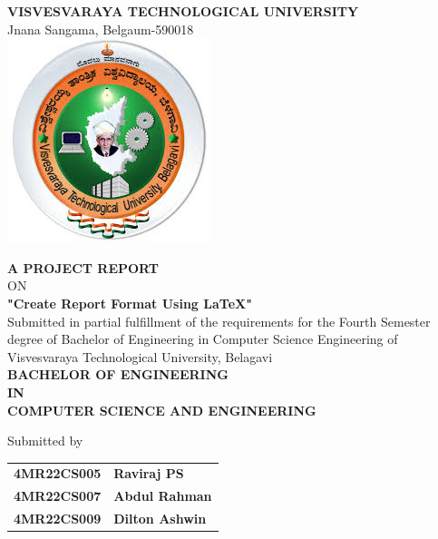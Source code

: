 \documentclass[12pt, a4paper]{report} %
\begin{document}
	
	\begin{titlepage} %
		\begin{center} %
			
			\textbf{{\large VISVESVARAYA TECHNOLOGICAL UNIVERSITY}}\\
			{\normalsize Jnana Sangama, Belgaum-590018}\\
			\vspace{0.3in}
			\includegraphics[scale=0.5]{images/vtu.jpeg}\\
			\vspace{0.3in}
			
			\textbf{A PROJECT REPORT} \\
			ON \\
			\vspace{0.2in}
			\textbf{{\large "Create Report Format Using LaTeX"}}\\
			\vspace{0.1in}
			{\small Submitted in partial fulfillment of the requirements for the Fourth Semester degree of 
              Bachelor of Engineering in Computer Science Engineering of Visvesvaraya Technological 
              University, Belagavi}\\
			\vspace{0.1in}
			\textbf{BACHELOR OF ENGINEERING\\IN\\COMPUTER SCIENCE AND ENGINEERING}\\
			\vspace{0.2in}
			
			Submitted by\\
			\vspace{0.08in}
			\begin{tabular}{ll}
				\textbf{4MR22CS005} & \textbf{Raviraj PS}\\
				\textbf{4MR22CS007} & \textbf{Abdul Rahman}\\
				\textbf{4MR22CS009} & \textbf{Dilton Ashwin}\\
			\end{tabular}
			

\end{center}
\end{titlepage}
\end{document}
